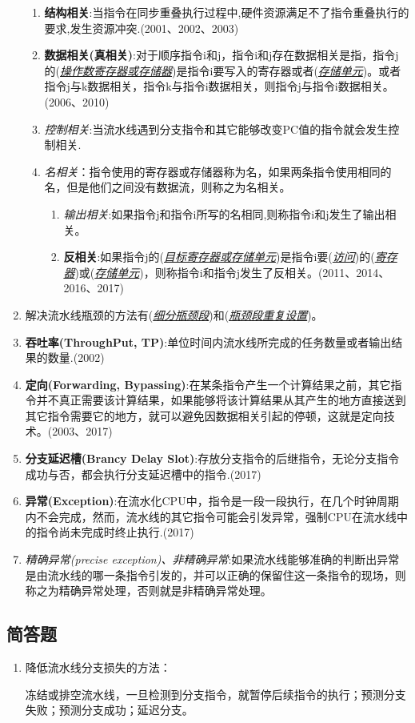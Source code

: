 \documentclass[a4paper]{ctexart}
\newcommand{\blank}[1]{(\emph{\underline{#1}})}
\begin{document}
\begin{enumerate}
  \begin{enumerate}
    \item \textbf{结构相关}:当指令在同步重叠执行过程中,硬件资源满足不了指令重叠执行的要求,发生资源冲突.(2001、2002、2003)
    \item \textbf{数据相关(真相关)}:对于顺序指令i和j，指令i和j存在数据相关是指，指令j的\blank{操作数寄存器或存储器}是指令i要写入的寄存器或者\blank{存储单元}。或者指令j与k数据相关，指令k与指令i数据相关，则指令j与指令i数据相关。(2006、2010)
    \item \emph{控制相关}:当流水线遇到分支指令和其它能够改变PC值的指令就会发生控制相关.
    \item \emph{名相关}：指令使用的寄存器或存储器称为名，如果两条指令使用相同的名，但是他们之间没有数据流，则称之为名相关。
    \begin{enumerate}
      \item \emph{输出相关}:如果指令j和指令i所写的名相同,则称指令i和j发生了输出相关。
      \item \textbf{反相关}:如果指令j的\blank{目标寄存器或存储单元}是指令i要\blank{访问}的\blank{寄存器}或\blank{存储单元}，则称指令i和指令j发生了反相关。(2011、2014、2016、2017)
    \end{enumerate}
  \end{enumerate}
  \item 解决流水线瓶颈的方法有\blank{细分瓶颈段}和\blank{瓶颈段重复设置}。
  \item \textbf{吞吐率(ThroughPut, TP)}:单位时间内流水线所完成的任务数量或者输出结果的数量.(2002)
  \item \textbf{定向(Forwarding, Bypassing)}:在某条指令产生一个计算结果之前，其它指令并不真正需要该计算结果，如果能够将该计算结果从其产生的地方直接送到其它指令需要它的地方，就可以避免因数据相关引起的停顿，这就是定向技术。(2003、2017)
  \item \textbf{分支延迟槽(Brancy Delay Slot)}:存放分支指令的后继指令，无论分支指令成功与否，都会执行分支延迟槽中的指令.(2017)
  \item \textbf{异常(Exception)}:在流水化CPU中，指令是一段一段执行，在几个时钟周期内不会完成，然而，流水线的其它指令可能会引发异常，强制CPU在流水线中的指令尚未完成时终止执行.(2017)
  \item \emph{精确异常(precise exception)、非精确异常}:如果流水线能够准确的判断出异常是由流水线的哪一条指令引发的，并可以正确的保留住这一条指令的现场，则称之为精确异常处理，否则就是非精确异常处理。
\end{enumerate}
\subsection{简答题}
\begin{enumerate}
  \item 降低流水线分支损失的方法：
  \begin{enumerate}
    冻结或排空流水线，一旦检测到分支指令，就暂停后续指令的执行；预测分支失败；预测分支成功；延迟分支。
  \end{enumerate}
\end{enumerate}
\end{document}
